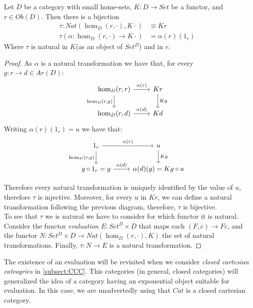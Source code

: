 \begin{theorem}\cite[Section 3.2]{mac2013categories}
  Let $D$ be a category with small home-sets, $K:D\to Set$ be a functor, and $r\in Ob(D)$. Then there is a bijection
  \begin{align*}
    \tau:Nat(\hom_D(r,\cdot), K\cdot) &\equiv Kr\\
    \tau(\alpha:\hom_D(r,\cdot)\to K\cdot)& = \alpha(r)(1_r)
  \end{align*}
  Where $\tau$ is natural in $K$(as an object of $Set^{D}$) and in $r$.
\end{theorem}
\begin{proof}
  As $\alpha$ is a natural transformation we have that, for every $g:r\to d\in Ar(D)$: 
    \[
      \begin{tikzcd}
        \hom_D(r,r)\arrow[swap]{d}{\hom_D(r,g)}\arrow{r}{\alpha(r)} & Kr\arrow{d}{Kg}\\
        \hom_D(r,d)\arrow{r}{\alpha(d)} & Kd
      \end{tikzcd}
    \]
Writing $\alpha(r)(1_r) = u$ we have that:
    \[
      \begin{tikzcd}
        1_r\arrow[swap]{d}{\hom_D(r,g)}\arrow{r}{\alpha(r)} & u\arrow{d}{Kg}\\
        g\circ 1_r = g\arrow{r}{\alpha(d)} & \alpha(d)(g)=Kg\circ u
      \end{tikzcd}
    \]

    Therefore every natural transformation is uniquely identified by the value of $u$, therefore $\tau$ is injective. Moreover, for every $u$ in $Kr$, we can define a natural transformation following the previous diagram, therefore, $\tau$ is bijective.\\

To see that $\tau$ we is natural we have to consider for which functor it is natural. Consider the functor \emph{evaluation} $E: Set^D\times D$ that maps each $(F,c)\to Fc$, and the functor $N:Set^D\times D\to Nat(\hom_D(r,\cdot),K)$ the set of natural transformations. Finally, $\tau:N\to E$ is a natural transformation.
\end{proof}
\begin{remark}
  The existence of an evaluation will be revisited when we consider \emph{closed cartesian cateogries} in  \ref{subsect:CCC}. This categories (in general, closed categories) will generalized the idea of a category having an exponential object suitable for evaluation. In this case, we are unadvertedly using that $Cat$ is a closed cartesian category.
\end{remark}


